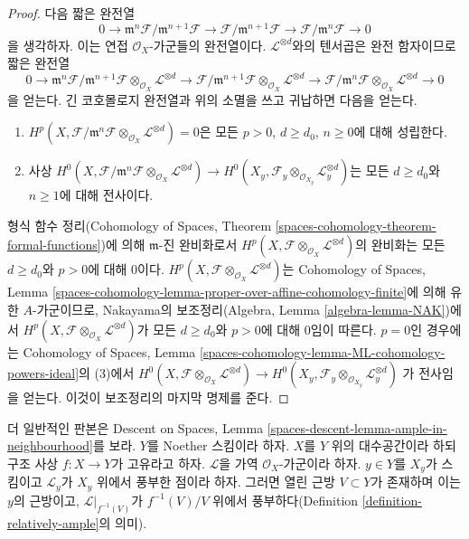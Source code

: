 \begin{proof}
\medskip\noindent
다음 짧은 완전열
$$
0 \to \mathfrak m^n\mathcal{F}/\mathfrak m^{n + 1} \mathcal{F}
\to \mathcal{F}/\mathfrak m^{n + 1} \mathcal{F}
\to \mathcal{F}/\mathfrak m^n \mathcal{F} \to 0
$$
을 생각하자. 이는 연접 $\mathcal{O}_X$-가군들의 완전열이다.
$\mathcal{L}^{\otimes d}$와의 텐서곱은 완전 함자이므로
짧은 완전열
$$
0 \to
\mathfrak m^n\mathcal{F}/\mathfrak m^{n + 1} \mathcal{F}
\otimes_{\mathcal{O}_X} \mathcal{L}^{\otimes d}
\to \mathcal{F}/\mathfrak m^{n + 1} \mathcal{F}
\otimes_{\mathcal{O}_X} \mathcal{L}^{\otimes d}
\to \mathcal{F}/\mathfrak m^n \mathcal{F}
\otimes_{\mathcal{O}_X} \mathcal{L}^{\otimes d} \to 0
$$
을 얻는다. 긴 코호몰로지 완전열과 위의 소멸을 쓰고 귀납하면 다음을
얻는다.
\begin{enumerate}
\item $H^p(X, \mathcal{F}/\mathfrak m^n \mathcal{F}
\otimes_{\mathcal{O}_X} \mathcal{L}^{\otimes d}) = 0$은 모든
$p > 0$, $d \geq d_0$, $n \geq 0$에 대해 성립한다.
\item 사상
$H^0(X, \mathcal{F}/\mathfrak m^n \mathcal{F}
\otimes_{\mathcal{O}_X} \mathcal{L}^{\otimes d}) \to
H^0(X_y, \mathcal{F}_y \otimes_{\mathcal{O}_{X_y}} \mathcal{L}_y^{\otimes d})$는
모든 $d \geq d_0$와 $n \geq 1$에 대해 전사이다.
\end{enumerate}
형식 함수 정리(Cohomology of Spaces, Theorem
\ref{spaces-cohomology-theorem-formal-functions})에 의해
$\mathfrak m$-진 완비화로서
$H^p(X, \mathcal{F} \otimes_{\mathcal{O}_X} \mathcal{L}^{\otimes d})$의
완비화는 모든 $d \geq d_0$와 $p > 0$에 대해 0이다.
$H^p(X, \mathcal{F} \otimes_{\mathcal{O}_X} \mathcal{L}^{\otimes d})$는
Cohomology of Spaces, Lemma
\ref{spaces-cohomology-lemma-proper-over-affine-cohomology-finite}에 의해
유한 $A$-가군이므로, Nakayama의 보조정리(Algebra, Lemma
\ref{algebra-lemma-NAK})에서
$H^p(X, \mathcal{F} \otimes_{\mathcal{O}_X} \mathcal{L}^{\otimes d})$가
모든 $d \geq d_0$와 $p > 0$에 대해 0임이 따른다.
$p = 0$인 경우에는 Cohomology of Spaces, Lemma
\ref{spaces-cohomology-lemma-ML-cohomology-powers-ideal}의 (3)에서
$H^0(X, \mathcal{F} \otimes_{\mathcal{O}_X} \mathcal{L}^{\otimes d}) \to
H^0(X_y, \mathcal{F}_y \otimes_{\mathcal{O}_{X_y}} \mathcal{L}_y^{\otimes d})$
가 전사임을 얻는다. 이것이 보조정리의 마지막 명제를 준다.
\end{proof}

\begin{lemma}
\label{lemma-ample-in-neighbourhood}
더 일반적인 판본은 Descent on Spaces, Lemma
\ref{spaces-descent-lemma-ample-in-neighbourhood}를 보라.
$Y$를 Noether 스킴이라 하자. $X$를 $Y$ 위의 대수공간이라 하되 구조
사상 $f : X \to Y$가 고유라고 하자.
$\mathcal{L}$을 가역 $\mathcal{O}_X$-가군이라 하자.
$y \in Y$를 $X_y$가 스킴이고 $\mathcal{L}_y$가 $X_y$ 위에서 풍부한
점이라 하자. 그러면 열린 근방 $V \subset Y$가 존재하며 이는 $y$의
근방이고,
$\mathcal{L}|_{f^{-1}(V)}$가 $f^{-1}(V)/V$ 위에서 풍부하다(Definition
\ref{definition-relatively-ample}의 의미).
\end{lemma}

